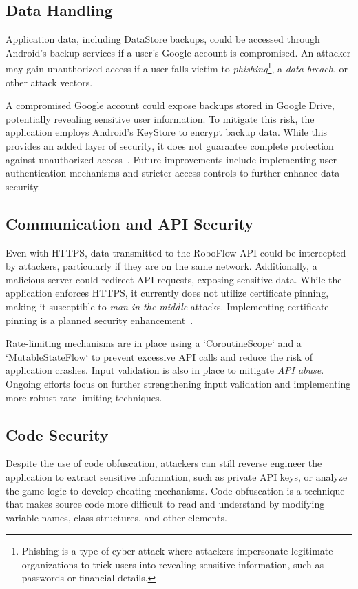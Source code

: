 \subsection{Data Handling}
Application data, including DataStore backups, could be accessed through Android's backup services if a user's Google account is compromised. An attacker may gain unauthorized access if a user falls victim to \textit{phishing}\footnote{Phishing is a type of cyber attack where attackers impersonate legitimate organizations to trick users into revealing sensitive information, such as passwords or financial details.}, a \textit{data breach}, or other attack vectors.


A compromised Google account could expose backups stored in Google Drive, potentially revealing sensitive user information. To mitigate this risk, the application employs Android's KeyStore to encrypt backup data. While this provides an added layer of security, it does not guarantee complete protection against unauthorized access~\cite{bib:android_data_backup}. Future improvements include implementing user authentication mechanisms and stricter access controls to further enhance data security.

\subsection{Communication and API Security}
Even with HTTPS, data transmitted to the RoboFlow API could be intercepted by attackers, particularly if they are on the same network. Additionally, a malicious server could redirect API requests, exposing sensitive data. While the application enforces HTTPS, it currently does not utilize certificate pinning, making it susceptible to \textit{man-in-the-middle} attacks. Implementing certificate pinning is a planned security enhancement~\cite{bib:owasp_top_ten}.  

Rate-limiting mechanisms are in place using a `CoroutineScope` and a `MutableStateFlow` to prevent excessive API calls and reduce the risk of application crashes. Input validation is also in place to mitigate \textit{API abuse}. Ongoing efforts focus on further strengthening input validation and implementing more robust rate-limiting techniques.

\subsection{Code Security}
Despite the use of code obfuscation, attackers can still reverse engineer the application to extract sensitive information, such as private API keys, or analyze the game logic to develop cheating mechanisms. Code obfuscation is a technique that makes source code more difficult to read and understand by modifying variable names, class structures, and other elements.

